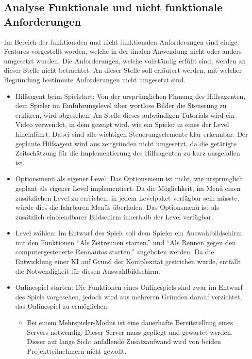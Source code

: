 \subsection{Analyse Funktionale und nicht funktionale Anforderungen}
Im Bereich der funktionalen und nicht funktionalen Anforderungen sind einige Features vorgestellt worden, welche in der finalen Anwendung nicht oder anders umgesetzt wurden. Die Anforderungen, welche vollständig erfüllt sind, werden an dieser Stelle nicht betrachtet. An dieser Stelle soll erläutert werden, mit welcher Begründung bestimmte Anforderungen nicht umgesetzt sind.
\begin{itemize}
    \item{Hilfsagent beim Spielstart: Von der ursprünglichen Planung des Hilfsagenten, dem Spieler im Einführungslevel über wortlose Bilder die Steuerung zu erklären, wird abgesehen. An Stelle dieses aufwändigen Tutorials wird ein Video verwendet, in dem gezeigt wird, wie ein Spieler in eines der Level hineinfährt. Dabei sind alle wichtigen Steuerungselemente klar erkennbar. Der geplante Hilfsagent wird aus zeitgründen nicht umgesetzt, da die getätigte Zeitschätzung für die Implementierung des Hilfsagenten zu kurz ausgefallen ist.}
    \item{Optionsmenü als eigener Level: Das Optionsmenü ist nicht, wie ursprünglich geplant als eigener Level implementiert. Da die Möglichkeit, im Menü einen zusätzlichen Level zu erreichen, in jedem Levelpaket verfügbar sein müsste, würde dies die fahrbaren Menüs überladen. Das Optionsmenü ist als zusätzlich einblendbarer Bildschirm innerhalb der Level verfügbar.}
    \item{Level wählen: Im Entwurf des Spiels soll dem Spieler ein Auswahlbildschirm mit den Funktionen \enquote{Als Zeitrennen starten.} und \enquote{Als Rennen gegen den computergesteuerte Rennautos starten.} angeboten werden. Da die Entwicklung einer KI auf Grund der Komplexität gestrichen wurde, entfällt die Notwendigkeit für diesen Auswahlbildschirm.}
    \item{Onlinespiel starten: Die Funktionen eines Onlinespiels sind zwar im Entwurf des Spiels vorgesehen, jedoch wird aus mehreren Gründen darauf verzichtet, das Onlinespiel zu ermöglichen:}
    \begin{itemize}
        \item{Bei einem Mehrspieler-Modus ist eine dauerhafte Bereitstellung eines Servers notwendig. Dieser Server muss gepflegt und gewartet werden. Dieser auf lange Sicht anfallende Zusatzaufwand wird von beiden Projektteilnehmern nicht gewollt.}

\end{itemize}
\end{itemize}
